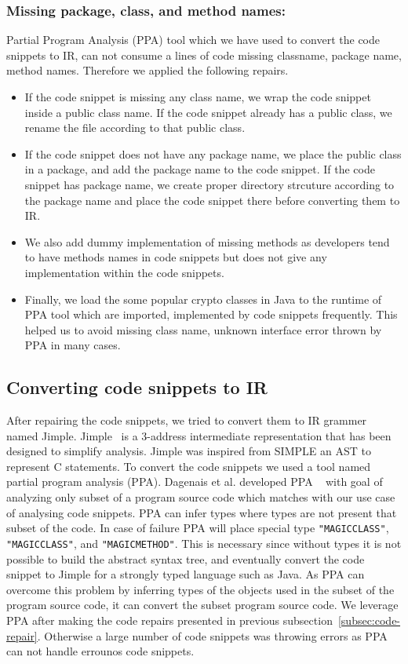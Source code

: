 \subsubsection{Missing package, class, and method names:}
Partial Program Analysis (PPA) tool which we have used to convert the code snippets to IR, can not consume a lines  of code missing classname, package name, method names. Therefore we applied the following repairs. 
\begin{itemize}
\item If the code snippet is missing any class name, we wrap the code snippet inside a public class name. If the code snippet already 
has a public class, we rename the file according to that public class.
\item If the code snippet does not have any package name, we place the public class in a package, and add the package name to the code snippet. 
If the code snippet has package name, we create proper directory strcuture according to the package name and place the code snippet there before converting them to IR. 
\item We also add dummy implementation of missing methods as developers tend to have methods names  in code snippets but does not give any implementation 
within the code snippets.
\item Finally, we load the some popular crypto classes in Java to the runtime of PPA tool which are imported, implemented by code snippets frequently. 
This helped us to avoid missing class name, unknown interface error thrown by PPA in many cases.  
 
\end{itemize}
       
\subsection{Converting code snippets to IR}
\label{subsec:converting-to-IR}

After repairing the code snippets, we tried to convert them to IR grammer named Jimple. Jimple~\cite{vallee1998jimple} is a 3-address intermediate representation that has been designed to simplify analysis. Jimple was inspired from SIMPLE an AST to represent C statements. To convert the code snippets we used a tool named partial program analysis (PPA). Dagenais et al. developed PPA ~\cite{dagenais2008enabling} with goal of analyzing only subset of a program source code which matches with our use case of analysing code snippets. PPA  can infer types where types are not present that subset of the code. In case of failure PPA will place special type \texttt{"MAGICCLASS"}, \texttt{"MAGICCLASS"}, and \texttt{"MAGICMETHOD"}. This is necessary since without types it is not possible to build the abstract syntax tree, and eventually convert the code snippet to Jimple for a strongly typed language such as Java. As PPA can overcome this problem by inferring types of the objects used in the subset of the program source code, it can convert the subset program source code. We leverage PPA after making the code repairs presented in previous subsection~\ref{subsec:code-repair}. Otherwise a large number of code snippets was throwing errors as PPA can not handle errounos code snippets.     

